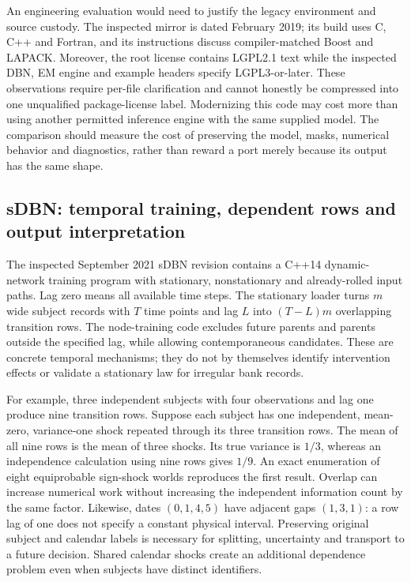 An engineering evaluation would need to justify the legacy environment and
source custody. The inspected mirror is dated February 2019; its build uses
C, C++ and Fortran, and its instructions discuss compiler-matched Boost and
LAPACK. Moreover, the root license contains LGPL2.1 text while the inspected
DBN, EM engine and example headers specify LGPL3-or-later. These observations
require per-file clarification and cannot honestly be compressed into one
unqualified package-license label. Modernizing this code may cost more than
using another permitted inference engine with the same supplied model. The
comparison should measure the cost of preserving the model, masks, numerical
behavior and diagnostics, rather than reward a port merely because its output
has the same shape. \citep{exec16_ct_mocapy,exec16_ct_design}

\subsection{sDBN: temporal training, dependent rows and output interpretation}

The inspected September 2021 sDBN revision contains a C++14 dynamic-network
training program with stationary, nonstationary and already-rolled input
paths. Lag zero means all available time steps. The stationary loader turns
$m$ wide subject records with $T$ time points and lag $L$ into
$(T-L)m$ overlapping transition rows. The node-training code excludes future
parents and parents outside the specified lag, while allowing contemporaneous
candidates. These are concrete temporal mechanisms; they do not by themselves
identify intervention effects or validate a stationary law for irregular bank
records. \citep{exec16_ct_sdbn}

For example, three independent subjects with four observations and lag one
produce nine transition rows. Suppose each subject has one independent,
mean-zero, variance-one shock repeated through its three transition rows.
The mean of all nine rows is the mean of three shocks. Its true variance is
$1/3$, whereas an independence calculation using nine rows gives $1/9$.
An exact enumeration of eight equiprobable sign-shock worlds reproduces the
first result. Overlap can increase numerical work without increasing the
independent information count by the same factor. Likewise, dates
$(0,1,4,5)$ have adjacent gaps $(1,3,1)$: a row lag of one does not specify a
constant physical interval. Preserving original subject and calendar labels
is necessary for splitting, uncertainty and transport to a future decision.
Shared calendar shocks create an additional dependence problem even when
subjects have distinct identifiers. \citep{exec16_ct_oracle}

